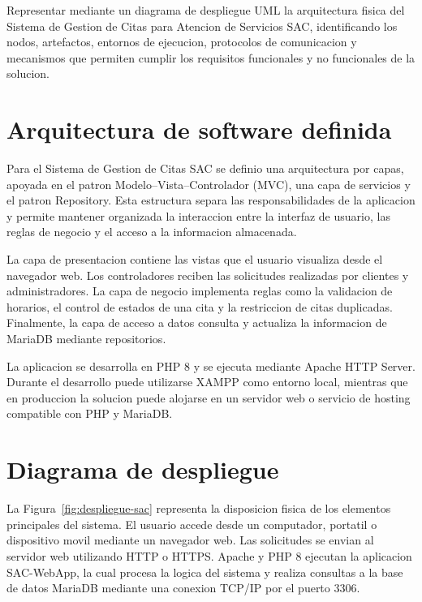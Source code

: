 \documentclass[12pt,letterpaper]{article}
\begin{document}
Representar mediante un diagrama de despliegue UML la arquitectura fisica del Sistema de Gestion de Citas para Atencion de Servicios SAC, identificando los nodos, artefactos, entornos de ejecucion, protocolos de comunicacion y mecanismos que permiten cumplir los requisitos funcionales y no funcionales de la solucion.

\section{Arquitectura de software definida}

Para el Sistema de Gestion de Citas SAC se definio una arquitectura por capas, apoyada en el patron Modelo--Vista--Controlador (MVC), una capa de servicios y el patron Repository. Esta estructura separa las responsabilidades de la aplicacion y permite mantener organizada la interaccion entre la interfaz de usuario, las reglas de negocio y el acceso a la informacion almacenada.

La capa de presentacion contiene las vistas que el usuario visualiza desde el navegador web. Los controladores reciben las solicitudes realizadas por clientes y administradores. La capa de negocio implementa reglas como la validacion de horarios, el control de estados de una cita y la restriccion de citas duplicadas. Finalmente, la capa de acceso a datos consulta y actualiza la informacion de MariaDB mediante repositorios.

La aplicacion se desarrolla en PHP 8 y se ejecuta mediante Apache HTTP Server. Durante el desarrollo puede utilizarse XAMPP como entorno local, mientras que en produccion la solucion puede alojarse en un servidor web o servicio de hosting compatible con PHP y MariaDB.

\section{Diagrama de despliegue}

La Figura~\ref{fig:despliegue-sac} representa la disposicion fisica de los elementos principales del sistema. El usuario accede desde un computador, portatil o dispositivo movil mediante un navegador web. Las solicitudes se envian al servidor web utilizando HTTP o HTTPS. Apache y PHP 8 ejecutan la aplicacion SAC-WebApp, la cual procesa la logica del sistema y realiza consultas a la base de datos MariaDB mediante una conexion TCP/IP por el puerto 3306.
\end{document}
